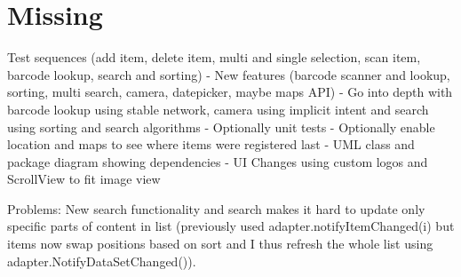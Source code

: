 \documentclass{article}
\begin{document}
\section{Missing}
Test sequences (add item, delete item, multi and single selection, scan item, barcode lookup, search and sorting)
- New features (barcode scanner and lookup, sorting, multi search, camera, datepicker, maybe maps API)
- Go into depth with barcode lookup using stable network, camera using implicit intent and search using sorting and search algorithms 
- Optionally unit tests 
- Optionally enable location and maps to see where items were registered last 
- UML class and package diagram showing dependencies 
- UI Changes using custom logos and ScrollView to fit image view 

Problems:
New search functionality and search makes it hard to update only specific parts of content in list (previously used adapter.notifyItemChanged(i) but items now swap positions based on sort and I thus refresh the whole list using adapter.NotifyDataSetChanged()).

	
\end{document}
